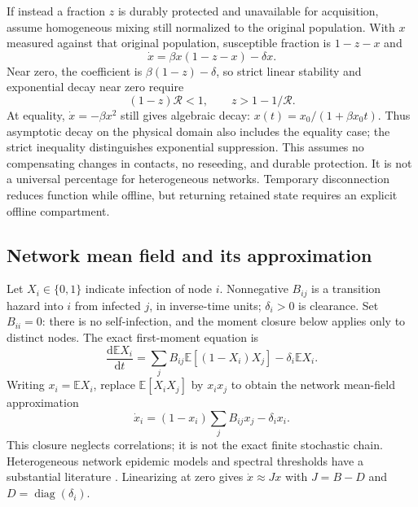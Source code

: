 \documentclass[11pt]{article}
\newcommand{\dd}{\mathrm d}
\newcommand{\E}{\mathbb E}
\newcommand{\R}{\mathcal R}
\begin{document}
If instead a fraction $z$ is durably protected and unavailable for acquisition, assume homogeneous mixing still normalized to the original population. With $x$ measured against that original population, susceptible fraction is $1-z-x$ and
\begin{equation}
\dot x=\beta x(1-z-x)-\delta x.
\end{equation}
Near zero, the coefficient is $\beta(1-z)-\delta$, so strict linear stability and exponential decay near zero require
\begin{equation}\label{eq:durable}
(1-z)\R<1,\qquad z>1-1/\R.
\end{equation}
At equality, $\dot x=-\beta x^2$ still gives algebraic decay: $x(t)=x_0/(1+\beta x_0t)$. Thus asymptotic decay on the physical domain also includes the equality case; the strict inequality distinguishes exponential suppression. This assumes no compensating changes in contacts, no reseeding, and durable protection. It is not a universal percentage for heterogeneous networks. Temporary disconnection reduces function while offline, but returning retained state requires an explicit offline compartment.

\subsection{Network mean field and its approximation}
Let $X_i\in\{0,1\}$ indicate infection of node $i$. Nonnegative $B_{ij}$ is a transition hazard into $i$ from infected $j$, in inverse-time units; $\delta_i>0$ is clearance. Set $B_{ii}=0$: there is no self-infection, and the moment closure below applies only to distinct nodes. The exact first-moment equation is
\begin{equation}
\frac{\dd\E X_i}{\dd t}=\sum_j B_{ij}\E[(1-X_i)X_j]-\delta_i\E X_i.
\end{equation}
Writing $x_i=\E X_i$, replace $\E[X_iX_j]$ by $x_ix_j$ to obtain the network mean-field approximation
\begin{equation}\label{eq:nimfa}
\dot x_i=(1-x_i)\sum_j B_{ij}x_j-\delta_i x_i.
\end{equation}
This closure neglects correlations; it is not the exact finite stochastic chain. Heterogeneous network epidemic models and spectral thresholds have a substantial literature \citep{network}. Linearizing at zero gives $\dot x\approx Jx$ with $J=B-D$ and $D=\operatorname{diag}(\delta_i)$.
\end{document}
